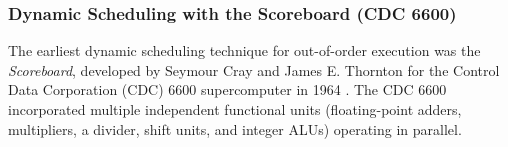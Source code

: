 \subsubsection{Dynamic Scheduling with the Scoreboard (CDC 6600)}\label{sec:scoreboard}

The earliest dynamic scheduling technique for out-of-order execution was the \emph{Scoreboard}, developed by Seymour Cray and James E. Thornton for the Control Data Corporation (CDC) 6600 supercomputer in 1964 \cite{thornton1964, thornton1970}. The CDC 6600 incorporated multiple independent functional units (floating-point adders, multipliers, a divider, shift units, and integer ALUs) operating in parallel. 

